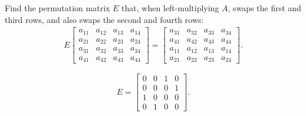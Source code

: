 \documentclass[reqno, answers]{exam}
\begin{document}
\begin{questions}
\question[5]
    Find the permutation matrix $E$ that, when left-multiplying $A$, swaps the first and third rows, and also swaps the second and fourth rows:
    \begin{align*}
      E \begin{bmatrix}
          a_{11} & a_{12} & a_{13} & a_{14} \\
          a_{21} & a_{22} & a_{23} & a_{24} \\
          a_{31} & a_{32} & a_{33} & a_{34} \\
          a_{41} & a_{42} & a_{43} & a_{44}
        \end{bmatrix}
      =
      \begin{bmatrix}
          a_{31} & a_{32} & a_{33} & a_{34} \\
          a_{41} & a_{42} & a_{43} & a_{44} \\
          a_{11} & a_{12} & a_{13} & a_{14} \\
          a_{21} & a_{22} & a_{23} & a_{24}
      \end{bmatrix}.
    \end{align*}
    \begin{solution}
      $$E = \begin{bmatrix}
          0 & 0 & 1 & 0 \\
          0 & 0 & 0 & 1 \\
          1 & 0 & 0 & 0 \\
          0 & 1 & 0 & 0
        \end{bmatrix}.
      $$
    \end{solution}


\end{questions}
\end{document}
